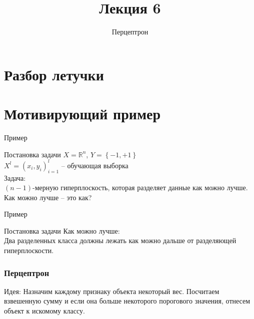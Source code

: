 \documentclass[10pt]{beamer}
\title{Лекция 6}
\subtitle{Перцептрон}
\begin{document}
\maketitle

\section{Разбор летучки}

\section{Мотивирующий пример}

\begin{frame}{Пример}
\end{frame}


\begin{frame}{Постановка задачи}
  $X = \mathbb{R}^n$, ${Y = \left\{ -1, + 1\right\}}$\\
  ${X^l = (x_i, y_i)_{i = 1}^l}$ -- обучающая выборка\\
  \bigbreak
  \alert{Задача}:\\
  $(n-1)$-мерную гиперплоскость, которая разделяет данные как можно лучше.
  \bigbreak \pause
  Как можно лучше -- это как?
\end{frame}

\begin{frame}{Пример}
\end{frame}

\begin{frame}{Постановка задачи}
  Как можно лучше:\\
  Два разделенных класса должны лежать как можно дальше от разделяющей гиперплоскости.
\end{frame}

\begin{frame}\frametitle{Перцептрон}
  \alert{Идея}: Назначим каждому признаку объекта некоторый вес. Посчитаем взвешенную сумму и если она больше некоторого порогового значения, отнесем объект к искомому классу. \\
\end{frame}
\end{document}

